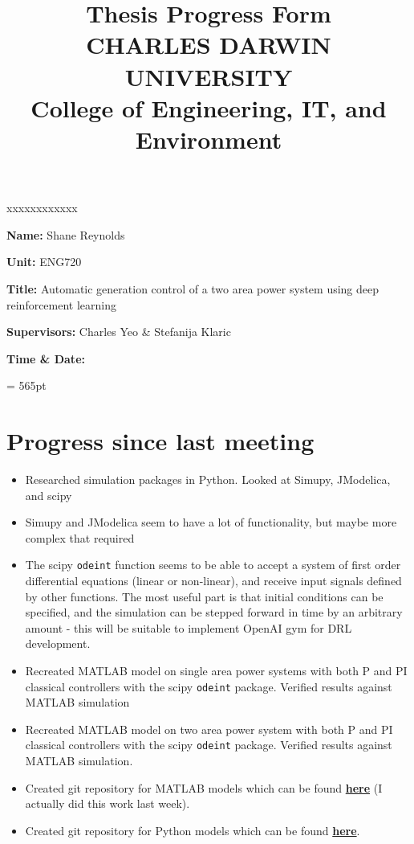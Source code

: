 \documentclass[12pt]{article}
\title{	
		Thesis Progress Form\\
		CHARLES DARWIN UNIVERSITY\\
		College of Engineering, IT, and Environment
	  }
\author{}
\date{}
\begin{document}
	
	\maketitle
	
	\begin{namelist}{xxxxxxxxxxxx}
		\item[{\bf Name:}]
			Shane Reynolds
		\item[{\bf Unit:}]
			ENG720
		\item[{\bf Title:}]
			Automatic generation control of a two area power system using deep reinforcement learning
		\item[{\bf Supervisors:}]
			Charles Yeo \& Stefanija Klaric
		\item[{\bf Time \& Date:}]
			
	\end{namelist}
	
	\pagestyle{plain} %
	\textheight = 565pt %
	
	\section{Progress since last meeting}
	\begin{itemize}
		\item Researched simulation packages in Python. Looked at Simupy, JModelica, and scipy
		\item Simupy and JModelica seem to have a lot of functionality, but maybe more complex that required
		\item The scipy \verb|odeint| function seems to be able to accept a system of first order differential equations (linear or non-linear), and receive input signals defined by other functions. The most useful part is that initial conditions can be specified, and the simulation can be stepped forward in time by an arbitrary amount - this will be suitable to implement OpenAI gym for DRL development.
		\item Recreated MATLAB model on single area power systems with both P and PI classical controllers with the scipy \verb|odeint| package. Verified results against MATLAB simulation
		\item Recreated MATLAB model on two area power system with both P and PI classical controllers with the scipy \verb|odeint| package. Verified results against MATLAB simulation.
		\item Created git repository for MATLAB models which can be found \href{https://github.com/skreynolds/ENG720_matlab_models}{\textbf{here}} (I actually did this work last week).
		\item Created git repository for Python models which can be found \href{https://github.com/skreynolds/ENG720_python_models}{\textbf{here}}.
	\end{itemize}
	
\end{document}
